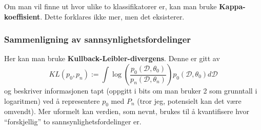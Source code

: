 Om man vil finne ut hvor ulike to klassifikatorer er, kan man bruke \textbf{Kappa-koeffisient}. Dette forklares ikke mer, men det eksisterer.

\subsubsection{Sammenligning av sannsynlighetsfordelinger}
Her kan man bruke \textbf{Kullback-Leibler-divergens}. Denne er gitt av \begin{equation}
		K L\left(p_{0}, p_{n}\right):=\int \log \left(\frac{p_{0}\left({\mathcal{D}}, \theta_{0}\right)}{p_{n}\left({\mathcal{D}}, \theta_{n}\right)}\right) p_{0}\left({\mathcal{D}}, \theta_{0}\right) d {\mathcal{D}}
\end{equation}
og beskriver informasjonen tapt (oppgitt i bits om man bruker 2 som grunntall i logaritmen) ved å representere $p_0$ med $P_n$ (tror jeg, potensielt kan det være omvendt). Mer uformelt kan verdien, som nevnt, brukes til å kvantifisere hvor ``forskjellig'' to sannsynlighetsfordelinger er.
